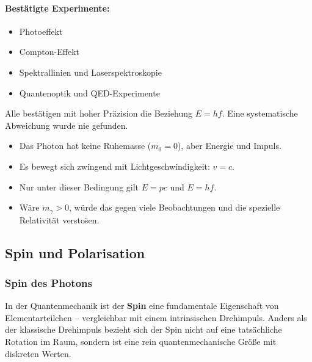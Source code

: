 \paragraph{Best\"atigte Experimente:}
\begin{itemize}
	\item Photoeffekt
	\item Compton-Effekt
	\item Spektrallinien und Laserspektroskopie
	\item Quantenoptik und QED-Experimente
\end{itemize}
Alle best\"atigen mit hoher Pr\"azision die Beziehung $E = hf$. Eine systematische Abweichung wurde nie gefunden.
\medskip
\begin{tcolorbox}[physikbox, title=Fazit: Warum das Photon masselos ist]
	\begin{itemize}
		\label{box:Warum das Photon}
		\item Das Photon hat keine Ruhemasse ($m_0 = 0$), aber Energie und Impuls.
		\item Es bewegt sich zwingend mit Lichtgeschwindigkeit: $v = c$.
		\item Nur unter dieser Bedingung gilt $E = pc$ und $E = hf$.
		\item W\"are $m_\gamma > 0$, w\"urde das gegen viele Beobachtungen und die spezielle Relativit\"at versto\"sen.
	\end{itemize}
\end{tcolorbox}
\medskip

\subsection{Spin und Polarisation}

\subsubsection{Spin des Photons}

In der Quantenmechanik ist der \textbf{Spin} eine fundamentale Eigenschaft von Elementarteilchen – vergleichbar mit einem intrinsischen Drehimpuls. Anders als der klassische Drehimpuls bezieht sich der Spin nicht auf eine tatsächliche Rotation im Raum, sondern ist eine rein quantenmechanische Größe mit diskreten Werten.

